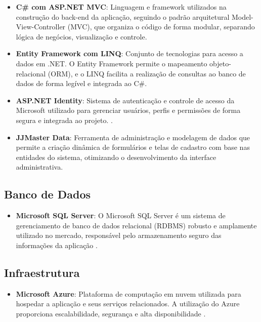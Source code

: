 \documentclass[
	12pt,				%
	openright,			%
	twoside,			%
	a4paper,			%
	english,			%
	french,				%
	spanish,			%
	brazil				%
	]{abntex2}
\begin{document}
\begin{itemize}

  \item \textbf{C\# com ASP.NET MVC}: Linguagem e framework utilizados na construção do back-end da aplicação, seguindo o padrão arquitetural Model-View-Controller (MVC), que organiza o código de forma modular, separando lógica de negócios, visualização e controle.

  \item \textbf{Entity Framework com LINQ}: Conjunto de tecnologias para acesso a dados em .NET. O Entity Framework permite o mapeamento objeto-relacional (ORM), e o LINQ facilita a realização de consultas ao banco de dados de forma legível e integrada ao C\#.

  \item \textbf{ASP.NET Identity}: Sistema de autenticação e controle de acesso da Microsoft utilizado para gerenciar usuários, perfis e permissões de forma segura e integrada ao projeto. \cite{AspNet2025}.

  \item \textbf{JJMaster Data}: Ferramenta de administração e modelagem de dados que permite a criação dinâmica de formulários e telas de cadastro com base nas entidades do sistema, otimizando o desenvolvimento da interface administrativa.

\end{itemize}

\subsection{Banco de Dados}

\begin{itemize}
    \item \textbf{Microsoft SQL Server}: O Microsoft SQL Server é um sistema de gerenciamento de banco de dados relacional (RDBMS) robusto e amplamente utilizado no mercado, responsável pelo armazenamento seguro das informações da aplicação \cite{SqlServer2025}.


\end{itemize}

\subsection{Infraestrutura}

\begin{itemize}
    \item \textbf{Microsoft Azure}: Plataforma de computação em nuvem utilizada para hospedar a aplicação e seus serviços relacionados. A utilização do Azure proporciona escalabilidade, segurança e alta disponibilidade \cite{Azure2025}.
\end{itemize}
\end{document}
